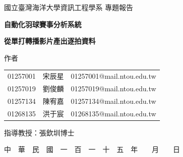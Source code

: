 
\begin{center}
\vspace*{1cm}

{\fontsize{12}{18}\selectfont 國立臺灣海洋大學資訊工程學系 專題報告}\par

\vspace*{3.5cm}

{\Huge\textbf{自動化羽球賽事分析系統}}\par
{\Large\textbf{從單打轉播影片產出逐拍資料}}\par

\vspace*{5cm}

{\fontsize{16}{24}\selectfont 作者}\par
\begin{tabular}{lll}
01257001 & 宋辰星 & 01257001@mail.ntou.edu.tw \\
01257019 & 劉俊麟 & 01257019@mail.ntou.edu.tw \\
01257134 & 陳宥嘉 & 01257134@mail.ntou.edu.tw \\
01268135 & 洪于宸 & 01268135@mail.ntou.edu.tw
\end{tabular}\par

\vspace*{1.5cm}

{\fontsize{16}{24}\selectfont 指導教授：張欽圳\hspace{0.5cm}博士}\par

\vspace*{2cm}

{\fontsize{12}{18}\selectfont 中　華　民　國　一　百　一　十　五　年　　月　　日}\par
\end{center}

\clearpage

